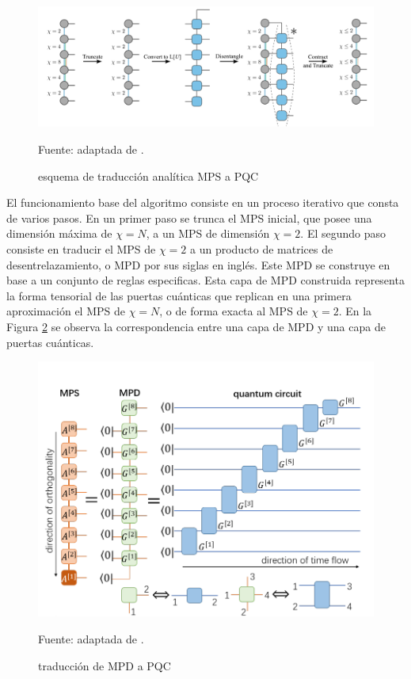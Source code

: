 \begin{figure}[!h]
    \centering
    \includegraphics[scale = 0.6]{img/05-mps_to_pqc_a.png}
    \caption{esquema de traducción analítica MPS a \mbox{PQC}}
    Fuente: adaptada de \cite{rudolph}.
    \label{fig:mps_to_pqc_a}
\end{figure}

\newpage

El funcionamiento base del algoritmo consiste en un proceso iterativo que consta de varios pasos. En un primer paso se trunca el MPS inicial, que posee una dimensión máxima de $\chi = N$, a un MPS de dimensión $\chi = 2$. El segundo paso consiste en traducir el MPS de $\chi = 2$ a un producto de matrices de desentrelazamiento, o MPD por sus siglas en inglés. Este MPD se construye en base a un conjunto de reglas especificas. Esta capa de MPD construida representa la forma tensorial de las puertas cuánticas que replican en una primera aproximación el MPS de $\chi = N$, o de forma exacta al MPS de $\chi = 2$. En la Figura \ref{fig:mpd_to_pqc} se observa la correspondencia entre una capa de MPD y una capa de puertas cuánticas.


\begin{figure}[!h]
    \centering
    \includegraphics[scale = 0.6]{img/05-mpd_to_quantum_circuit.png}
    \caption{traducción de MPD a \mbox{PQC}}
    Fuente: adaptada de \cite{ran}.
    \label{fig:mpd_to_pqc}
\end{figure}

